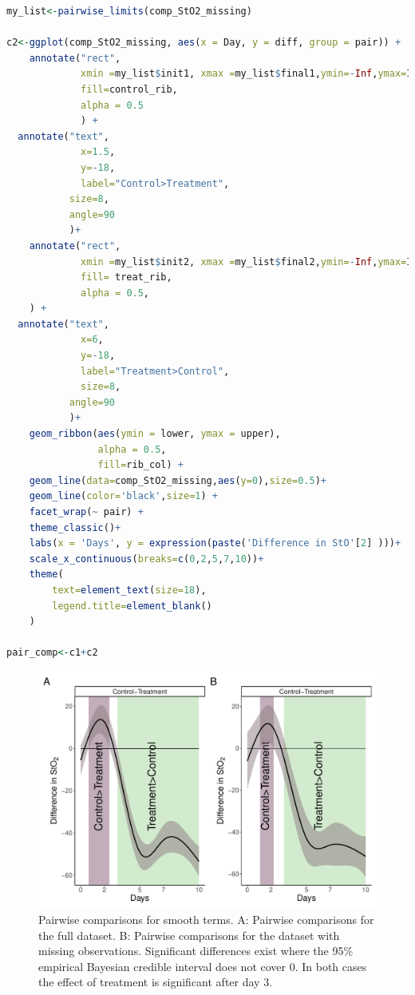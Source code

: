 \documentclass[
]{article}
\begin{document}
\begin{lstlisting}[language=R]
my_list<-pairwise_limits(comp_StO2_missing)

c2<-ggplot(comp_StO2_missing, aes(x = Day, y = diff, group = pair)) +
    annotate("rect",
             xmin =my_list$init1, xmax =my_list$final1,ymin=-Inf,ymax=Inf,
             fill=control_rib,
             alpha = 0.5
             ) +
  annotate("text",
             x=1.5,
             y=-18,
             label="Control>Treatment",
           size=8,
           angle=90
           )+
    annotate("rect",
             xmin =my_list$init2, xmax =my_list$final2,ymin=-Inf,ymax=Inf,
             fill= treat_rib,
             alpha = 0.5,
    ) +
  annotate("text",
             x=6,
             y=-18,
             label="Treatment>Control",
             size=8,
           angle=90
           )+
    geom_ribbon(aes(ymin = lower, ymax = upper),
                alpha = 0.5,
                fill=rib_col) +
    geom_line(data=comp_StO2_missing,aes(y=0),size=0.5)+
    geom_line(color='black',size=1) +
    facet_wrap(~ pair) +
    theme_classic()+
    labs(x = 'Days', y = expression(paste('Difference in StO'[2] )))+
    scale_x_continuous(breaks=c(0,2,5,7,10))+
    theme(
        text=element_text(size=18),
        legend.title=element_blank()
    )

pair_comp<-c1+c2
\end{lstlisting}

\begin{figure}

{\centering \includegraphics[width=0.75\linewidth]{SIM_Appendix_files/figure-latex/plot-pairwise-comp-Appendix-1} 

}

\caption{Pairwise comparisons for smooth terms. A: Pairwise comparisons for the full dataset. B: Pairwise comparisons for the dataset with missing observations. Significant differences exist where the 95\% empirical Bayesian credible interval does not cover 0. In both cases the effect of treatment is significant after day 3.}\label{fig:plot-pairwise-comp-Appendix}
\end{figure}
\end{document}
